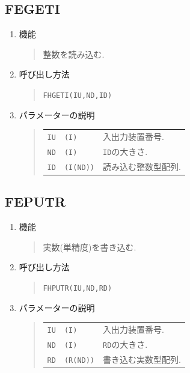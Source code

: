 \subsection{FEGETI}
\begin{enumerate}
  \item 機能 
  \begin{quote}
   整数を読み込む.
  \end{quote}
  \item 呼び出し方法 
  \begin{quote}
    {\tt FHGETI(IU,ND,ID)}
  \end{quote}
  \item パラメーターの説明 
  \begin{quote}
    \begin{tabular}{llp{10cm}}
      {\tt IU}   & {\tt (I)} & 入出力装置番号. \\
      {\tt ND}   & {\tt (I)} & {\tt ID}の大きさ.\\
      {\tt ID}   & {\tt (I(ND))} & 読み込む整数型配列.
    \end{tabular}
  \end{quote}
\end{enumerate}

\subsection{FEPUTR}
\begin{enumerate}
  \item 機能
  \begin{quote}
   実数(単精度)を書き込む.
  \end{quote}
  \item 呼び出し方法 
  \begin{quote}
    {\tt FHPUTR(IU,ND,RD)}
  \end{quote}
  \item パラメーターの説明 
  \begin{quote}
    \begin{tabular}{llp{10cm}}
      {\tt IU}   & {\tt (I)} & 入出力装置番号. \\
      {\tt ND}   & {\tt (I)} & {\tt RD}の大きさ.\\
      {\tt RD}   & {\tt (R(ND))} & 書き込む実数型配列.
    \end{tabular}
  \end{quote}
\end{enumerate}

